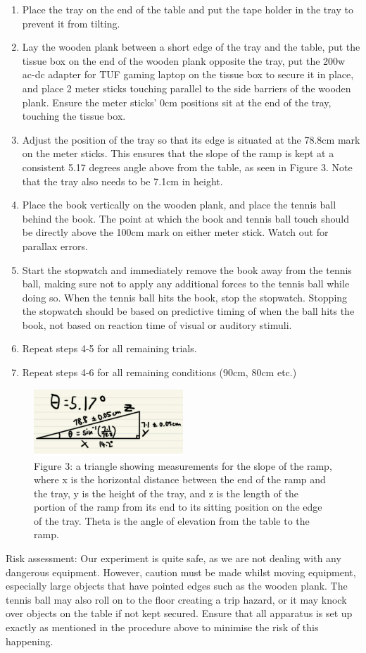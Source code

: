 \documentclass[12pt]{report}
\begin{document}
\begin{enumerate}
    \item Place the tray on the end of the table and put the tape holder in the tray to prevent it from tilting.
    \item Lay the wooden plank between a short edge of the tray and the table, put the tissue box on the end of the wooden plank opposite the tray, put the 200w ac-dc adapter for TUF gaming laptop on the tissue box to secure it in place, and place 2 meter sticks touching parallel to the side barriers of the wooden plank. Ensure the meter sticks’ 0cm positions sit at the end of the tray, touching the tissue box.
    \item Adjust the position of the tray so that its edge is situated at the 78.8cm mark on the meter sticks. This ensures that the slope of the ramp is kept at a consistent 5.17 degrees angle above from the table, as seen in Figure 3. Note that the tray also needs to be 7.1cm in height.
    \item Place the book vertically on the wooden plank, and place the tennis ball behind the book. The point at which the book and tennis ball touch should be directly above the 100cm mark on either meter stick. Watch out for parallax errors.
    \item Start the stopwatch and immediately remove the book away from the tennis ball, making sure not to apply any additional forces to the tennis ball while doing so. When the tennis ball hits the book, stop the stopwatch. Stopping the stopwatch should be based on predictive timing of when the ball hits the book, not based on reaction time of visual or auditory stimuli.
    \item Repeat steps 4-5 for all remaining trials.
    \item Repeat steps 4-6 for all remaining conditions (90cm, 80cm etc.)
\end{enumerate}
\begin{figure}
    \centering
    \includegraphics[width=0.5\textwidth]{working.png}
    \caption{Figure 3: a triangle showing measurements for the slope of the ramp, where x is the horizontal distance between the end of the ramp and the tray, y is the height of the tray, and z is the length of the portion of the ramp from its end to its sitting position on the edge of the tray. Theta is the angle of elevation from the table to the ramp.}
\end{figure}
Risk assessment:
Our experiment is quite safe, as we are not dealing with any dangerous equipment. However, caution must be made whilst moving equipment, especially large objects that have pointed edges such as the wooden plank. The tennis ball may also roll on to the floor creating a trip hazard, or it may knock over objects on the table if not kept secured. Ensure that all apparatus is set up exactly as mentioned in the procedure above to minimise the risk of this happening.
\end{document}
